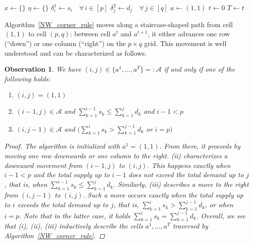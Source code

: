 \documentclass[10pt,a4paper]{amsart}
\newtheorem{observation}[theorem]{Observation}
\begin{document}
\begin{algorithm}[ht]
\caption{Northwest-corner rule}\label{NW_corner_rule}
\DontPrintSemicolon
$x \gets \{\}$\;
$\eta \gets \{\}$\;
$\delta_i^1 \gets s_i \quad \forall \, i \in [p]$ 
$\delta_j^2 \gets d_j \quad \forall \, j \in [q]$ 
$a \gets (1,1)$ 
$t \gets 0$\;
$T \gets t$\;
\end{algorithm}

Algorithm~\ref{NW_corner_rule} moves along a staircase-shaped path from cell $(1,1)$ to cell $(p,q)$: between cell $a^t$ and $a^{t+1}$, it either advances one row (\enquote{down}) or one column (\enquote{right}) on the $p \times q$ grid. This movement is well understood and can be characterized as follows.
\begin{observation}\label{NW_corner_characterization}
    We have $(i, j) \in \{ a^1, \dots, a^T \} =: \mathcal{A}$ if and only if one of the following holds:
    \begin{enumerate}
        \item[(i)] $(i, j) = (1, 1)$
        \item[(ii)] $(i-1, j) \in \mathcal{A}$ and $\sum_{k=1}^{i-1} s_k \leq \sum_{k=1}^{j} d_k$ and $i-1 < p$
        \item[(iii)] $(i, j-1) \in \mathcal{A}$ and $\bigl(\sum_{k=1}^{i} s_k > \sum_{k=1}^{j-1} d_k$ or $i = p \bigr)$
    \end{enumerate}
    \begin{proof}
        The algorithm is initialized with $a^1 = (1, 1)$. From there, it proceeds by moving one row downwards or one column to the right. \textit{(ii)} characterizes a downward movement from $(i-1, j)$ to $(i, j)$. This happens exactly when $i - 1 < p$ and the total supply up to $i-1$ does not exceed the total demand up to $j$, that is, when $\sum_{k=1}^{i-1} s_k \leq \sum_{k=1}^{j} d_k$. Similarly, \textit{(iii)} describes a move to the right from $(i, j-1)$ to $(i, j)$. Such a move occurs exactly when the total supply up to $i$ exceeds the total demand up to $j$, that is, $\sum_{k=1}^{i} s_k > \sum_{k=1}^{j-1} d_k$, or when $i = p$. Note that in the latter case, it holds $\sum_{k=1}^{i} s_k = \sum_{k=1}^{j-1} d_k$. Overall, we see that \textit{(i), (ii), (iii)} inductively describe the cells $a^1, \dots, a^T$ traversed by Algorithm~\ref{NW_corner_rule}.
    \end{proof}
\end{observation}
\end{document}
